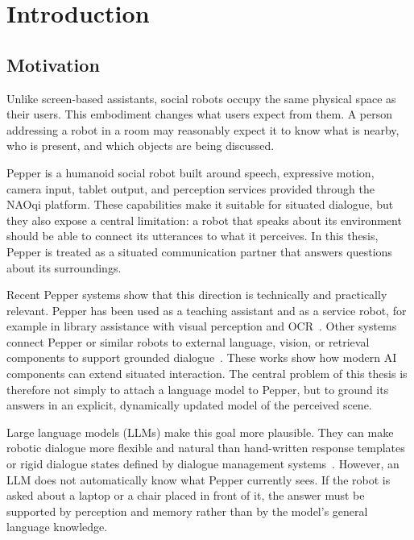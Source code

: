 \chapter{Introduction}\label{chap:intro}

\section{Motivation}

Unlike screen-based assistants, social robots occupy the same physical space as their users. This embodiment changes what users expect from them. A person addressing a robot in a room may reasonably expect it to know what is nearby, who is present, and which objects are being discussed.

Pepper is a humanoid social robot built around speech, expressive motion, camera input, tablet output, and perception services provided through the NAOqi platform. These capabilities make it suitable for situated dialogue, but they also expose a central limitation: a robot that speaks about its environment should be able to connect its utterances to what it perceives. In this thesis, Pepper is treated as a situated communication partner that answers questions about its surroundings.

Recent Pepper systems show that this direction is technically and practically relevant. Pepper has been used as a teaching assistant and as a service robot, for example in library assistance with visual perception and OCR~\cite{sievers_humanoid_2025,trinquet_future_2025}. Other systems connect Pepper or similar robots to external language, vision, or retrieval components to support grounded dialogue~\cite{brad_retrieval-augmented_2025,grassi_grounding_2024,latif_physicsassistant_2024}. These works show how modern AI components can extend situated interaction. The central problem of this thesis is therefore not simply to attach a language model to Pepper, but to ground its answers in an explicit, dynamically updated model of the perceived scene.

Large language models (LLMs) make this goal more plausible. They can make robotic dialogue more flexible and natural than hand-written response templates or rigid dialogue states defined by dialogue management systems~\cite{aturhurra_leveraging_2024}. However, an LLM does not automatically know what Pepper currently sees. If the robot is asked about a laptop or a chair placed in front of it, the answer must be supported by perception and memory rather than by the model's general language knowledge.

